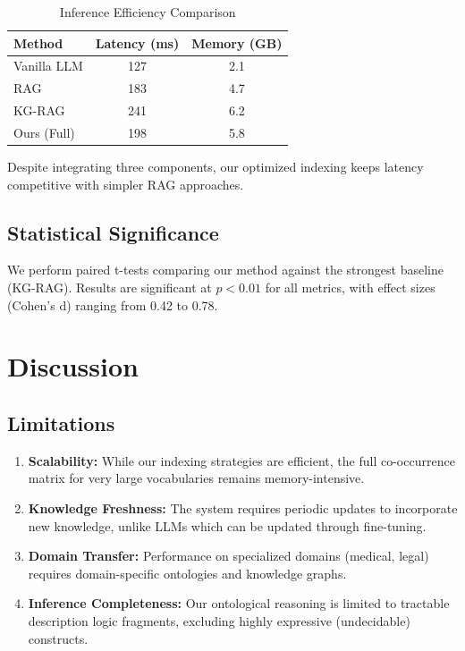 \documentclass[conference]{IEEEtran}
\begin{document}
\begin{table}[h]
\centering
\caption{Inference Efficiency Comparison}
\label{tab:efficiency}
\begin{tabular}{lcc}
\toprule
\textbf{Method} & \textbf{Latency (ms)} & \textbf{Memory (GB)} \\
\midrule
Vanilla LLM & 127 & 2.1 \\
RAG & 183 & 4.7 \\
KG-RAG & 241 & 6.2 \\
Ours (Full) & 198 & 5.8 \\
\bottomrule
\end{tabular}
\end{table}

Despite integrating three components, our optimized indexing keeps latency competitive with simpler RAG approaches.

\subsection{Statistical Significance}

We perform paired t-tests comparing our method against the strongest baseline (KG-RAG). Results are significant at $p < 0.01$ for all metrics, with effect sizes (Cohen's d) ranging from 0.42 to 0.78.

\section{Discussion}

\subsection{Limitations}

\begin{enumerate}
    \item \textbf{Scalability:} While our indexing strategies are efficient, the full co-occurrence matrix for very large vocabularies remains memory-intensive.
    
    \item \textbf{Knowledge Freshness:} The system requires periodic updates to incorporate new knowledge, unlike LLMs which can be updated through fine-tuning.
    
    \item \textbf{Domain Transfer:} Performance on specialized domains (medical, legal) requires domain-specific ontologies and knowledge graphs.
    
    \item \textbf{Inference Completeness:} Our ontological reasoning is limited to tractable description logic fragments, excluding highly expressive (undecidable) constructs.
\end{enumerate}
\end{document}

